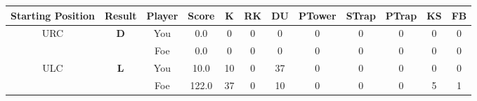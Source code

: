 \documentclass[a4paper,12pt]{article}
\begin{document}
  \begin{tabular}[t]{| c | c | c | c | c | c | c | c | c | c | c | c
      |}
    \hline
    Starting Position & \textbf{Result} & Player & \textbf{Score} & K & RK & DU & PTower & STrap & PTrap & KS & FB \\
    
      
                      
      
        \hline
        \multirow{2}{*}{  URC
             } &
              \multirow{2}{*}{  
                  \textbf{D}  } & 
                    \cellcolor{yellow!25} You & \cellcolor{yellow!25} 0.0 & \cellcolor{yellow!25} 0 &
                    \cellcolor{yellow!25} 0 & \cellcolor{yellow!25} 0 & \cellcolor{yellow!25} 0 &
                    \cellcolor{yellow!25} 0 & \cellcolor{yellow!25} 0 & \cellcolor{yellow!25} 0 &
                    \cellcolor{yellow!25} 0 \\
                    \cline{3-12}
                    & & \cellcolor{red!15} Foe & \cellcolor{red!15} 0.0 & \cellcolor{red!15} 0 & \cellcolor{red!15}
                    0 & \cellcolor{red!15} 0
                    & \cellcolor{red!15} 0 & \cellcolor{red!15}
                    0 & \cellcolor{red!15} 0 
                    & \cellcolor{red!15} 0 & \cellcolor{red!15}
                    0 \\
                    
                      
      
                      
      
                      
      
                      
      
        \hline
        \multirow{2}{*}{  ULC  } &
              \multirow{2}{*}{  \textbf{L}  } & 
                    \cellcolor{yellow!25} You & \cellcolor{yellow!25} 10.0 & \cellcolor{yellow!25} 10 &
                    \cellcolor{yellow!25} 0 & \cellcolor{yellow!25} 37 & \cellcolor{yellow!25} 0 &
                    \cellcolor{yellow!25} 0 & \cellcolor{yellow!25} 0 & \cellcolor{yellow!25} 0 &
                    \cellcolor{yellow!25} 0 \\
                    \cline{3-12}
                    & & \cellcolor{red!15} Foe & \cellcolor{red!15} 122.0 & \cellcolor{red!15} 37 & \cellcolor{red!15}
                    0 & \cellcolor{red!15} 10
                    & \cellcolor{red!15} 0 & \cellcolor{red!15}
                    0 & \cellcolor{red!15} 0 
                    & \cellcolor{red!15} 5 & \cellcolor{red!15}
                    1 \\
                    

\end{tabular}
\end{document}
